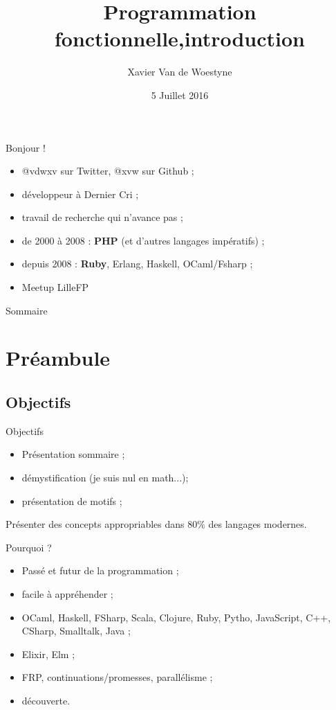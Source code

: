 \documentclass{beamer}
\title[Programmation fonctionnelle]{Programmation fonctionnelle,\newline introduction}
\author{Xavier Van de Woestyne}
\date{5 Juillet 2016}
\institute{Dernier Cri}
\begin{document}
	\maketitle


	\begin{frame}{Bonjour !}
		\begin{itemize}
			\item \alert{@vdwxv} sur Twitter, \alert{@xvw} sur Github ;
			\item développeur à \alert{Dernier Cri} ;
			\item travail de recherche qui n'avance pas ;
			\item de 2000 à 2008 : \textbf{PHP} (et d'autres langages impératifs) ;
			\item depuis 2008 : \textbf{Ruby}, \alert{Erlang}, \alert{Haskell}, \alert{OCaml/Fsharp} ;
			\item Meetup \alert{LilleFP}
		\end{itemize}
	\end{frame}

	\begin{frame}{Sommaire}
    \begin{multicols}{2}
		    \tableofcontents
    \end{multicols}
	\end{frame}

	\section{Préambule}

	\subsection{Objectifs}
	\begin{frame}{Objectifs}
		\begin{itemize}
			\item Présentation sommaire ;
			\item démystification (je suis nul en math...);
			\item présentation de motifs ;
		\end{itemize}
		Présenter des concepts appropriables dans 80\% des langages
		modernes.
	\end{frame}

  \begin{frame}{Pourquoi ?}
    \begin{itemize}
      \item Passé et futur de la programmation ;
      \item facile à appréhender ;
      \item OCaml, Haskell, FSharp, Scala, Clojure, Ruby, Pytho, JavaScript, C++, CSharp, Smalltalk, Java ;
      \item Elixir, Elm ;
      \item FRP, continuations/promesses, parallélisme ;
      \item découverte.
    \end{itemize}
  \end{frame}
\end{document}
